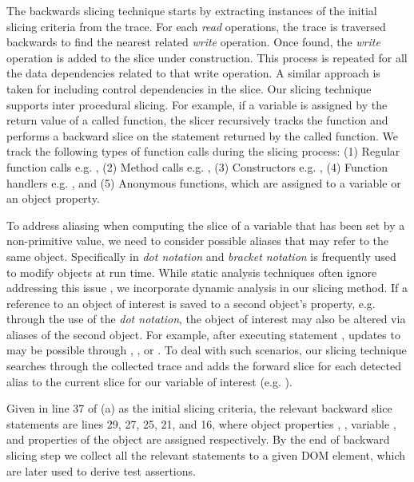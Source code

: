 The backwards slicing technique starts by extracting instances of the initial slicing criteria from the trace. For each \textit{read} operations, the trace is traversed backwards to find the nearest related \textit{write} operation. Once found, the \textit{write} operation is added to the slice under construction. This process is repeated for all the data dependencies related to that write operation. A similar approach is taken for including control dependencies in the slice. 
Our slicing technique supports inter procedural slicing. For example, if a variable is assigned by the return value of a called function, the slicer recursively tracks the function and performs a backward slice on the statement returned by the called function.
We track the following types of function calls during the slicing process: (1) Regular function calls e.g. , (2) Method calls e.g. ,
(3) Constructors e.g. , (4) Function handlers e.g. , 
and (5) Anonymous functions, which are assigned to a variable or an object property.
  
To address aliasing when computing the slice of a variable that has been set by a non-primitive value, we need to consider possible aliases that may refer to the same object. Specifically in \javascript \textit{dot notation} and \textit{bracket notation} is frequently used to modify objects at run time. While static analysis techniques often ignore addressing this issue \cite{Feldthaus:icse13}, we incorporate dynamic analysis in our slicing method. If a reference to an object of interest is saved to a second object's property, e.g. through the use of the \textit{dot notation}, the object of interest may also be altered via aliases of the second object. For example, after executing statement , updates to  may be possible through , , or . To deal with such scenarios, our slicing technique searches through the collected trace and adds the forward slice for each detected alias to the current slice for our variable of interest (e.g. ). 

Given  in line 37 of  (a) as the initial slicing criteria, the relevant backward slice statements are lines 29, 27, 25, 21, and 16, where object properties , , variable , and properties of the object  are assigned respectively.
By the end of backward slicing step we collect all the relevant statements to a given DOM element, which are later used to derive test assertions.    